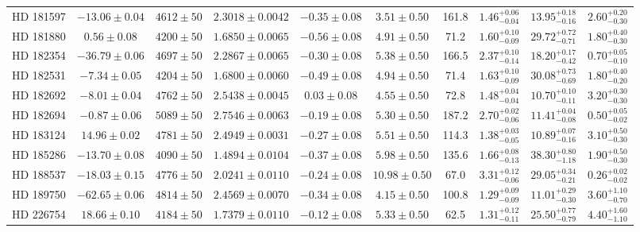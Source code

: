 \begin{table*}
\begin{tabular}{cccccccccc}
HD 181597 & $-13.06 \pm 0.04$ & $4612 \pm 50$ & $2.3018 \pm 0.0042$ & $-0.35 \pm 0.08$ & $3.51 \pm 0.50$ & 161.8 & $1.46^{+0.06}_{-0.04}$ & $13.95^{+0.18}_{-0.16}$ & $2.60^{+0.20}_{-0.30}$ \\
HD 181880 & $0.56 \pm 0.08$ & $4200 \pm 50$ & $1.6850 \pm 0.0065$ & $-0.56 \pm 0.08$ & $4.91 \pm 0.50$ & 71.2 & $1.60^{+0.10}_{-0.09}$ & $29.72^{+0.72}_{-0.71}$ & $1.80^{+0.40}_{-0.30}$ \\
HD 182354 & $-36.79 \pm 0.06$ & $4697 \pm 50$ & $2.2867 \pm 0.0065$ & $-0.30 \pm 0.08$ & $5.38 \pm 0.50$ & 166.5 & $2.37^{+0.10}_{-0.14}$ & $18.20^{+0.17}_{-0.42}$ & $0.70^{+0.05}_{-0.10}$ \\
HD 182531 & $-7.34 \pm 0.05$ & $4204 \pm 50$ & $1.6800 \pm 0.0060$ & $-0.49 \pm 0.08$ & $4.94 \pm 0.50$ & 71.4 & $1.63^{+0.10}_{-0.09}$ & $30.08^{+0.73}_{-0.69}$ & $1.80^{+0.40}_{-0.20}$ \\
HD 182692 & $-8.01 \pm 0.04$ & $4762 \pm 50$ & $2.5438 \pm 0.0045$ & $0.03 \pm 0.08$ & $4.55 \pm 0.50$ & 72.8 & $1.48^{+0.04}_{-0.04}$ & $10.70^{+0.10}_{-0.11}$ & $3.20^{+0.30}_{-0.30}$ \\
HD 182694 & $-0.87 \pm 0.06$ & $5089 \pm 50$ & $2.7546 \pm 0.0063$ & $-0.19 \pm 0.08$ & $5.30 \pm 0.50$ & 187.2 & $2.70^{+0.02}_{-0.06}$ & $11.41^{+0.04}_{-0.08}$ & $0.50^{+0.05}_{-0.02}$ \\
HD 183124 & $14.96 \pm 0.02$ & $4781 \pm 50$ & $2.4949 \pm 0.0031$ & $-0.27 \pm 0.08$ & $5.51 \pm 0.50$ & 114.3 & $1.38^{+0.03}_{-0.05}$ & $10.89^{+0.07}_{-0.16}$ & $3.10^{+0.50}_{-0.30}$ \\
HD 185286 & $-13.70 \pm 0.08$ & $4090 \pm 50$ & $1.4894 \pm 0.0104$ & $-0.37 \pm 0.08$ & $5.98 \pm 0.50$ & 135.6 & $1.66^{+0.08}_{-0.13}$ & $38.30^{+0.80}_{-1.18}$ & $1.90^{+0.50}_{-0.30}$ \\
HD 188537 & $-18.03 \pm 0.15$ & $4776 \pm 50$ & $2.0241 \pm 0.0110$ & $-0.24 \pm 0.08$ & $10.98 \pm 0.50$ & 67.0 & $3.31^{+0.12}_{-0.06}$ & $29.05^{+0.34}_{-0.21}$ & $0.26^{+0.02}_{-0.02}$ \\
HD 189750 & $-62.65 \pm 0.06$ & $4814 \pm 50$ & $2.4569 \pm 0.0070$ & $-0.34 \pm 0.08$ & $4.15 \pm 0.50$ & 100.8 & $1.29^{+0.09}_{-0.09}$ & $11.01^{+0.29}_{-0.30}$ & $3.60^{+1.10}_{-0.70}$ \\
HD 226754 & $18.66 \pm 0.10$ & $4184 \pm 50$ & $1.7379 \pm 0.0110$ & $-0.12 \pm 0.08$ & $5.33 \pm 0.50$ & 62.5 & $1.31^{+0.12}_{-0.11}$ & $25.50^{+0.77}_{-0.79}$ & $4.40^{+1.60}_{-1.10}$ \\
\hline
\end{tabular}
\end{table*}

